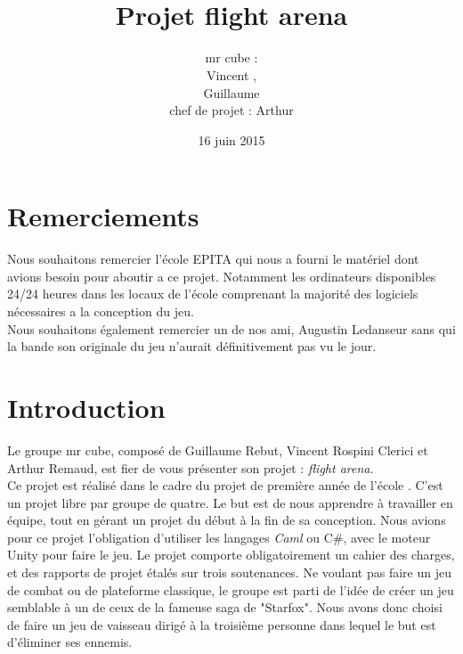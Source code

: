 \documentclass[12pt, titlepage]{article}
\title{\bsc{rapport de projet}\\Projet flight arena}
\author{mr cube :\\
Vincent \bsc{Rospini-Clerici},\\
Guillaume \bsc{Rebut}\\
chef de projet : Arthur \bsc{Remaud}}
\date{16 juin 2015}
\begin{document}
\begin{spacing}{1.5}

\maketitle

\section*{Remerciements}
Nous souhaitons remercier l'école EPITA qui nous a fourni le matériel dont avions besoin pour aboutir a ce projet. Notamment les ordinateurs disponibles 24/24 heures dans les locaux de l'école comprenant la majorité des logiciels nécessaires a la conception du jeu.\\

Nous souhaitons également remercier un de nos ami, Augustin Ledanseur sans qui la bande son originale du jeu n'aurait définitivement pas vu le jour. \\

\newpage

\renewcommand{\contentsname}{Sommaire}
\renewcommand{\chaptername}{Partie}

\tableofcontents
{}


\newpage
\section*{Introduction}
Le groupe mr cube, composé de Guillaume Rebut, Vincent Rospini Clerici et Arthur Remaud, est fier de vous présenter son projet : \textit{flight arena}.\\

Ce projet est réalisé dans le cadre  du projet de première année de l'école . C’est un projet libre par groupe de quatre. Le but est de nous apprendre à travailler en équipe, tout en gérant un projet du début à la fin de sa conception. Nous avions pour ce projet l'obligation d'utiliser les langages \textit{Caml} ou {C\#}, avec le moteur Unity pour faire le jeu. Le projet comporte obligatoirement un cahier des charges, et des rapports de projet étalés sur trois soutenances. Ne voulant pas faire un jeu de combat ou de plateforme classique, le groupe est parti de l’idée de créer un jeu semblable à un de ceux de la fameuse saga de "Starfox". Nous avons donc choisi de faire un jeu de vaisseau dirigé à la troisième personne dans lequel le but est d'éliminer ses ennemis.\\


\end{spacing}
\end{document}
